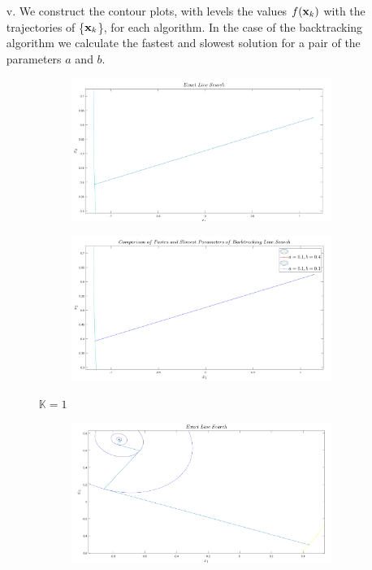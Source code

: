 \documentclass[12pt]{article}
\begin{document}
\begin{enumerate}
\begin{enumerate}
			\item[v.]
			We construct the contour plots, with levels the values $f({\bf x}_k)$ with the trajectories of \{${\bf x}_k$\}, for each algorithm. In the case of the backtracking algorithm we calculate the fastest and slowest solution for a pair of the parameters $a$ and $b$.
			\begin{figure}[h!]
				\centering
				\begin{subfigure}[b]{0.45\textwidth}
					\centering
					\includegraphics[width=\textwidth]{1_3.png}
				\end{subfigure}
				\hfill
				\begin{subfigure}[b]{0.45\textwidth}
					\centering
					\includegraphics[width=\textwidth]{1_2.png}
				\end{subfigure}
				\caption{$\mathbb{K}=1$}
			\end{figure}
			\begin{figure}
				\centering
				\begin{subfigure}[b]{0.45\textwidth}
					\centering
					\includegraphics[width=\textwidth]{2_3.png}

\end{subfigure}
\end{figure}
\end{enumerate}
\end{enumerate}
\end{document}
